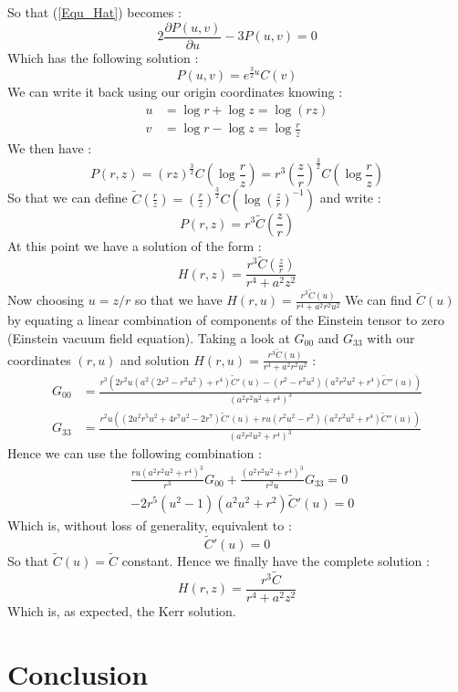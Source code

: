\documentclass[a4paper,12pt]{article}
\theoremstyle{definition}
\begin{document}
So that (\ref{Equ_Hat}) becomes :
\begin{equation}
	2\frac{\partial P(u,v)}{\partial u}-3P(u,v)=0
\end{equation}
Which has the following solution :
\begin{equation}
	P(u,v)=e^{\frac{3}{2}u}C(v)
\end{equation}
We can write it back using our origin coordinates knowing :
\begin{equation}
\begin{split}
	u&=\log{r} + \log{z}=\log{(rz)}\\
	v&=\log{r} - \log{z}=\log{\frac{r}{z}}
\end{split}
\end{equation}
We then have :
\begin{equation}
	P(r,z)=(rz)^\frac{3}{2}C(\log{\frac{r}{z}})=r^3(\frac{z}{r})^\frac{3}{2}C(\log{\frac{r}{z}})
\end{equation}
So that we can define $\tilde C(\frac{r}{z})=(\frac{r}{z})^\frac{3}{2}C(\log{(\frac{z}{r})^{-1}})$ and write :
\begin{equation}
	P(r,z)=r^3\tilde C(\frac{z}{r})
\end{equation}
At this point we have a solution of the form :
\begin{equation}
	H(r,z)=\frac{r^3\tilde C(\frac{z}{r})}{r^4+a^2z^2}
\end{equation}
Now choosing $u=z/r$ so that we have $H(r,u)=\frac{r^3\tilde C(u)}{r^4+a^2r^2u^2}$
We can find $\tilde C(u)$ by equating a linear combination of components of the Einstein tensor to zero (Einstein vacuum field equation).
Taking a look at $G_{00}$ and $G_{33}$ with our coordinates $(r,u)$ and solution $H(r,u)=\frac{r^3\tilde C(u)}{r^4+a^2r^2u^2}$ :
\begin{equation}
\begin{split}
	G_{00}&=\frac{r^3 (2 r^2 u (a^2 (2 r^2-r^2
	u^2)+r^4) \tilde C'(u)-(r^2-r^2
	u^2) (a^2 r^2 u^2+r^4)
	\tilde C''(u))}{(a^2 r^2
	u^2+r^4)^3}\\
	G_{33}&=\frac{r^2 u ((2 a^2 r^5
   u^2+4 r^7 u^2-2 r^7)\tilde C'(u)+r u (r^2 u^2-r^2) (a^2
   r^2 u^2+r^4) \tilde C''(u)
   )}{(a^2 r^2 u^2+r^4)^3}
\end{split}
\end{equation}
Hence we can use the following combination :
\begin{equation}
\begin{split}
	&\frac{ru(a^2 r^2 u^2+r^4)^3}{r^3}G_{00}+\frac{(a^2 r^2 u^2+r^4)^3}{r^2u}G_{33}=0\\
	&-2 r^5 (u^2-1) (a^2 u^2+r^2)\tilde C'(u)=0
\end{split}
\end{equation}
Which is, without loss of generality, equivalent to :
\begin{equation}
	\tilde C'(u)=0
\end{equation}
So that $\tilde C(u)=\tilde C$ constant. Hence we finally have the complete solution :
\begin{equation}
	H(r,z)=\frac{r^3\tilde C}{r^4+a^2z^2}
\end{equation}
Which is, as expected, the Kerr solution.

\section{Conclusion}
\end{document}
